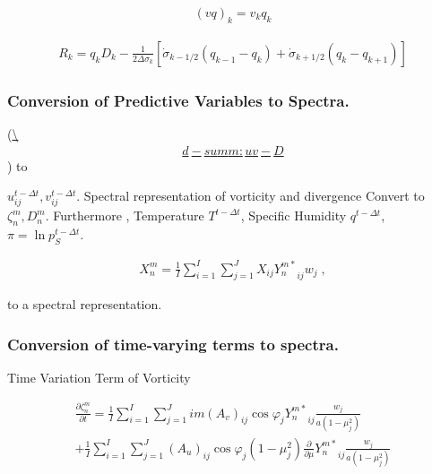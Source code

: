 \begin{eqnarray}
 (v q)_k  = v_k q_k
\end{eqnarray}

\begin{eqnarray}
R_k  =  q_k D_k 
       - \frac{1}{2 \Delta \sigma_k} 
             [   \dot{\sigma}_{k-1/2} ( q_{k-1} - q_k   )
               + \dot{\sigma}_{k+1/2} ( q_k   - q_{k+1} ) ]
\end{eqnarray}

\hypertarget{conversion-of-predictive-variables-to-spectra.}{%
\subsubsection{Conversion of Predictive Variables to
Spectra.}\label{conversion-of-predictive-variables-to-spectra.}}

(\protect\hyperlink{d-summ:uv-D}{\textbackslash{}\d\begin{eqnarray}d-summ:uv-D\end{eqnarray}}) to

\(u_{ij}^{t-\Delta t}, v_{ij}^{t-\Delta t}\). Spectral representation of
vorticity and divergence Convert to \(\zeta_n^m, D_n^m\). Furthermore ,
Temperature \(T^{t-\Delta t}\), Specific Humidity \(q^{t-\Delta t}\),
\(\pi = \ln p_S^{t-\Delta t}\).

\begin{eqnarray}
  X_n^m  =  \frac{1}{I} \sum_{i=1}^{I} \sum_{j=1}^{J}  
               X_{ij} {Y_n^{m *}}_{ij}  w_j \; ,
\end{eqnarray}

to a spectral representation.

\hypertarget{conversion-of-time-varying-terms-to-spectra.}{%
\subsubsection{Conversion of time-varying terms to
spectra.}\label{conversion-of-time-varying-terms-to-spectra.}}

Time Variation Term of Vorticity

\begin{eqnarray}
  \frac{\partial \zeta_n^m}{\partial t} 
   =  \frac{1}{I} \sum_{i=1}^{I} \sum_{j=1}^{J}  
          im (A_v)_{ij} \cos \varphi_j
          {Y_n^{m *}}_{ij}
         \frac{w_j}{a(1-\mu_j^{2})} 
          \\
   +    \frac{1}{I} \sum_{i=1}^{I} \sum_{j=1}^{J}  
          (A_u)_{ij} \cos \varphi_j
          (1-\mu_j^2) 
          \frac{\partial }{\partial \mu} {Y_n^{m *}}_{ij}
          \frac{w_j}{a(1-\mu_j^{2})} 
          \\ 
\end{eqnarray}

